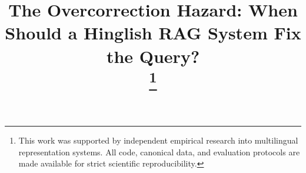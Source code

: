 \documentclass[conference]{IEEEtran}
\begin{document}
\title{The Overcorrection Hazard: When Should a Hinglish RAG System Fix the Query?\\
\thanks{This work was supported by independent empirical research into multilingual representation systems. All code, canonical data, and evaluation protocols are made available for strict scientific reproducibility.}
}

\author{
}

\maketitle
\end{document}
